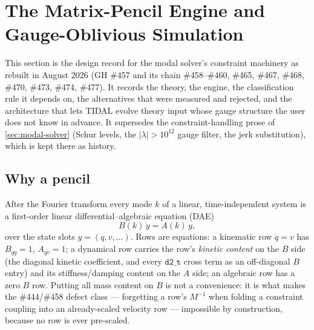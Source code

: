 
\section{The Matrix-Pencil Engine and Gauge-Oblivious Simulation}
\label{sec:pencil-engine}

This section is the design record for the modal solver's constraint
machinery as rebuilt in August 2026 (GH \#457 and its chain \#458--\#460,
\#465, \#467, \#468, \#470, \#473, \#474, \#477). It records the theory, the
engine, the classification rule it depends on, the alternatives that were
measured and rejected, and the architecture that lets TIDAL evolve theory
input whose gauge structure the user does not know in advance. It
supersedes the constraint-handling prose of \cref{sec:modal-solver}
(Schur levels, the $|\lambda| > 10^{12}$ gauge filter, the jerk
substitution), which is kept there as history.

\subsection{Why a pencil}
\label{sec:pencil-why}

After the Fourier transform every mode $k$ of a linear, time-independent
system is a first-order linear differential--algebraic equation (DAE)
\begin{equation}
  B(k)\,\dot y = A(k)\,y ,
  \label{eq:pencil-dae}
\end{equation}
over the state slots $y = (q, v, \ldots)$. Rows are equations: a
kinematic row $\dot q = v$ has $B_{qq} = 1$, $A_{qv} = 1$; a dynamical
row carries the row's \emph{kinetic content} on the $B$ side (the
diagonal kinetic coefficient, and every $\texttt{d2\_t}$ cross term as
an off-diagonal $B$ entry) and its stiffness/damping content on the $A$
side; an algebraic row has a zero $B$ row. Putting all mass content on
$B$ is not a convenience: it is what makes the \#444/\#458 defect class
--- forgetting a row's $M^{-1}$ when folding a constraint coupling into
an already-scaled velocity row --- impossible by construction, because
no row is ever pre-scaled.

